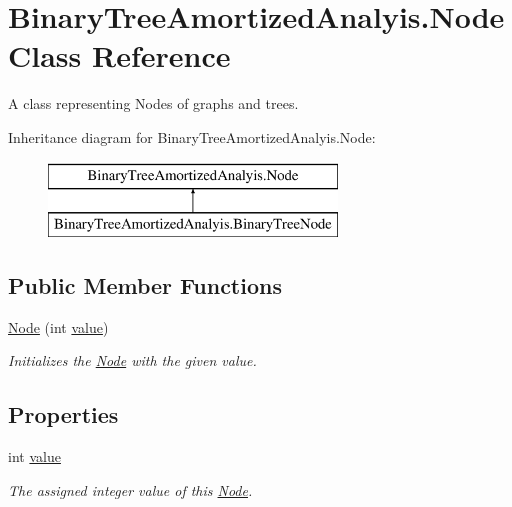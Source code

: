 \hypertarget{class_binary_tree_amortized_analyis_1_1_node}{}\section{Binary\+Tree\+Amortized\+Analyis.\+Node Class Reference}
\label{class_binary_tree_amortized_analyis_1_1_node}


A class representing Nodes of graphs and trees.  


Inheritance diagram for Binary\+Tree\+Amortized\+Analyis.\+Node\+:\begin{figure}[H]
\begin{center}
\leavevmode
\includegraphics[height=2.000000cm]{class_binary_tree_amortized_analyis_1_1_node}
\end{center}
\end{figure}
\subsection*{Public Member Functions}
\begin{DoxyCompactItemize}
\item 
\hyperlink{class_binary_tree_amortized_analyis_1_1_node_aff14ec21343bbdbcc8676bb1c6976b66}{Node} (int \hyperlink{class_binary_tree_amortized_analyis_1_1_node_a8489bd56607921a85529e723135db6aa}{value})
\begin{DoxyCompactList}\small\item\em Initializes the \hyperlink{class_binary_tree_amortized_analyis_1_1_node}{Node} with the given value. \end{DoxyCompactList}\end{DoxyCompactItemize}
\subsection*{Properties}
\begin{DoxyCompactItemize}
\item 
int \hyperlink{class_binary_tree_amortized_analyis_1_1_node_a8489bd56607921a85529e723135db6aa}{value}
\begin{DoxyCompactList}\small\item\em The assigned integer value of this \hyperlink{class_binary_tree_amortized_analyis_1_1_node}{Node}. \end{DoxyCompactList}\end{DoxyCompactItemize}


